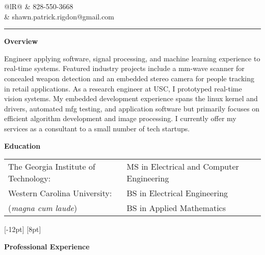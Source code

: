 \documentclass[14pt,letterpaper]{extarticle}
\begin{document}
\pagestyle{empty}

\newcommand{\newsection}[1]{
\bigskip\medskip
\noindent\textbf{\large{#1}}
}


\noindent
\begin{tabularx}{\linewidth}{@{}lR@{}}
 & \footnotesize{828-550-3668} \\[-4pt]
& \footnotesize{shawn.patrick.rigdon@gmail.com} \\[-4pt]
\end{tabularx}

\smallskip
\noindent\rule[\baselineskip]{\linewidth}{1.5pt}


\noindent\textbf{\large{Overview}}

\medskip
\noindent\footnotesize{Engineer applying software, signal processing, and machine learning experience
to real-time systems.  Featured industry projects include a mm-wave scanner for concealed weapon
detection and an embedded stereo camera for people tracking in retail applications.  As a research
engineer at USC, I prototyped real-time vision systems. My embedded development experience spans
the linux kernel and drivers, automated mfg testing, and application software but primarily focuses on
efficient algorithm development and image processing. I currently offer my services as a consultant to
a small number of tech startups.}

\newsection{Education}

\medskip\noindent
\begin{tabular}{@{}ll@{}}
\footnotesize{The Georgia Institute of Technology:} & \footnotesize{MS in Electrical and Computer Engineering}\\[5pt]
\footnotesize{Western Carolina University:} & \footnotesize{BS in Electrical Engineering}\\
\footnotesize{(\textit{magna cum laude})} & \footnotesize{BS in Applied Mathematics}\\
\end{tabular}
[-12pt]
[8pt]

\newsection{Professional Experience}

\newcommand{\experience}[4]{
\medskip
\marginnote{\footnotesize{\textit{#1}}}
\noindent\footnotesize{\textbf{#2} \textit{(#3)}}\\
#4
}
\end{document}
